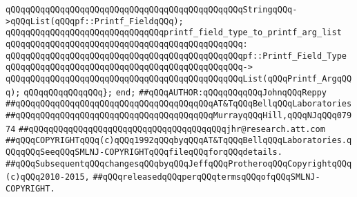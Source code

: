 \verb|qQQqqQQqqQQqqQQqqQQqqQQqqQQqqQQqqQQqqQQqqQQqqQQqStringqQQq->qQQqList(qQQqpf::Printf_FieldqQQq);|\newline
\newline
\verb|qQQqqQQqqQQqqQQqqQQqqQQqqQQqqQQqprintf_field_type_to_printf_arg_list|\newline
\verb|qQQqqQQqqQQqqQQqqQQqqQQqqQQqqQQqqQQqqQQqqQQqqQQq:|\newline
\verb|qQQqqQQqqQQqqQQqqQQqqQQqqQQqqQQqqQQqqQQqqQQqqQQqpf::Printf_Field_Type|\newline
\verb|qQQqqQQqqQQqqQQqqQQqqQQqqQQqqQQqqQQqqQQqqQQqqQQq->|\newline
\verb|qQQqqQQqqQQqqQQqqQQqqQQqqQQqqQQqqQQqqQQqqQQqqQQqList(qQQqPrintf_ArgqQQq);|\newline
\newline
\verb|qQQqqQQqqQQqqQQq};|\newline
\verb|end;|\newline
\newline
\verb|##qQQqAUTHOR:qQQqqQQqqQQqJohnqQQqReppy|\newline
\verb|##qQQqqQQqqQQqqQQqqQQqqQQqqQQqqQQqqQQqqQQqAT&TqQQqBellqQQqLaboratories|\newline
\verb|##qQQqqQQqqQQqqQQqqQQqqQQqqQQqqQQqqQQqqQQqMurrayqQQqHill,qQQqNJqQQq07974|\newline
\verb|##qQQqqQQqqQQqqQQqqQQqqQQqqQQqqQQqqQQqqQQqjhr@research.att.com|\newline
\verb|##qQQqCOPYRIGHTqQQq(c)qQQq1992qQQqbyqQQqAT&TqQQqBellqQQqLaboratories.qQQqqQQqSeeqQQqSMLNJ-COPYRIGHTqQQqfileqQQqforqQQqdetails.|\newline
\verb|##qQQqSubsequentqQQqchangesqQQqbyqQQqJeffqQQqProtheroqQQqCopyrightqQQq(c)qQQq2010-2015,|\newline
\verb|##qQQqreleasedqQQqperqQQqtermsqQQqofqQQqSMLNJ-COPYRIGHT.|\newline

